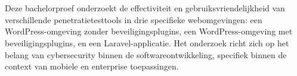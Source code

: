 
%
%
%
%
%

%



\chapter*{}

Deze bachelorproef onderzoekt de effectiviteit en gebruiksvriendelijkheid van verschillende penetratietesttools in drie specifieke webomgevingen: 
een WordPress-omgeving zonder beveiligingsplugins, een WordPress-omgeving met beveiligingsplugins, en een Laravel-applicatie. Het onderzoek richt 
zich op het belang van cybersecurity binnen de softwareontwikkeling, specifiek binnen de context van mobiele en enterprise toepassingen.

